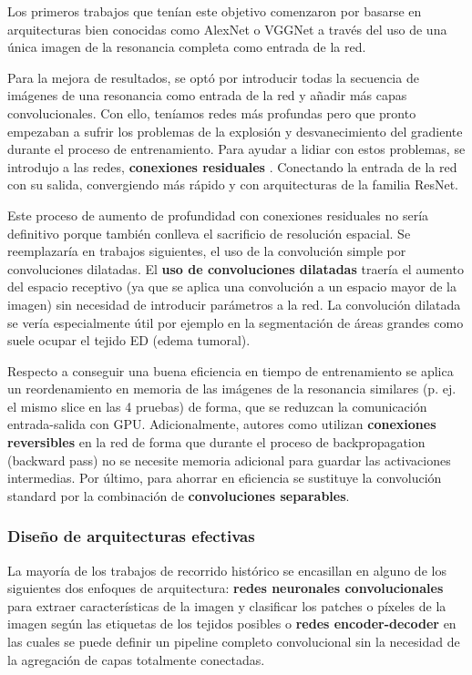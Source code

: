 			Los primeros trabajos que tenían este objetivo comenzaron por basarse en arquitecturas bien conocidas como AlexNet o VGGNet a través del uso de una única imagen de la resonancia completa como entrada de la red.
			
			Para la mejora de resultados, se optó por introducir todas la secuencia de imágenes de una resonancia como entrada de la red y añadir más capas convolucionales. Con ello, teníamos redes más profundas pero que pronto empezaban a sufrir los problemas de la explosión y desvanecimiento del gradiente durante el proceso de entrenamiento. Para ayudar a lidiar con estos problemas, se introdujo a las redes, \textbf{conexiones residuales} \cite{chang2016fully}. Conectando la entrada de la red con su salida, convergiendo más rápido y con arquitecturas de la familia ResNet. 
			
			Este proceso de aumento de profundidad con conexiones residuales no sería definitivo porque también conlleva el sacrificio de resolución espacial. Se reemplazaría en trabajos siguientes, el uso de la convolución simple por convoluciones dilatadas. El \textbf{uso de convoluciones dilatadas} traería el aumento del espacio receptivo (ya que se aplica una convolución a un espacio mayor de la imagen) sin necesidad de introducir parámetros a la red. La convolución dilatada se vería especialmente útil por ejemplo en la segmentación de áreas grandes como suele ocupar el tejido ED (edema tumoral). 
			
			Respecto a conseguir una buena eficiencia en tiempo de entrenamiento se aplica un reordenamiento en memoria de las imágenes de la resonancia similares (p. ej. el mismo slice en las 4 pruebas) de forma, que se reduzcan la comunicación entrada-salida con GPU. Adicionalmente, autores como \cite{brugger2019partially} utilizan \textbf{conexiones reversibles}  en la red de forma que durante el proceso de backpropagation (backward pass) no se necesite memoria adicional para guardar las activaciones intermedias. Por último, para ahorrar en eficiencia se sustituye la convolución standard por la combinación de \textbf{convoluciones separables}.
			
			\subsubsection{Diseño de arquitecturas efectivas}
			
			La mayoría de los trabajos de recorrido histórico se encasillan en alguno de los siguientes dos enfoques de arquitectura: \textbf{redes neuronales convolucionales} para extraer características de la imagen y clasificar los patches o píxeles de la imagen según las etiquetas de los tejidos posibles o \textbf{redes encoder-decoder} en las cuales se puede definir un pipeline completo convolucional sin la necesidad de la agregación de capas totalmente conectadas.
			
